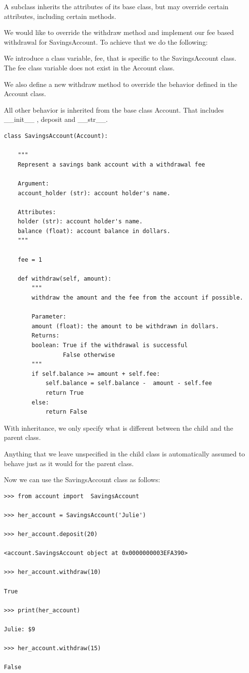 \documentclass{article}
\begin{document}
A subclass inherits the attributes of its base class, but may override certain attributes, including certain methods. 

We would like to override the withdraw method and implement our fee based withdrawal for SavingsAccount.  To achieve that we do the following:

We introduce a class variable, fee, that is specific to the SavingsAccount class.  The fee class variable does not exist in the Account class.  

We also define a new withdraw method to override the behavior defined in the Account class.  

All other behavior is inherited from the base class Account.  That includes {\_}{\_}init{\_}{\_} , deposit and {\_}{\_}str{\_}{\_}.

\begin{lstlisting}
class SavingsAccount(Account):
 
    """
    Represent a savings bank account with a withdrawal fee 
 
    Argument:
    account_holder (str): account holder's name.
 
    Attributes:
    holder (str): account holder's name.
    balance (float): account balance in dollars.
    """
 
    fee = 1
 
    def withdraw(self, amount):
        """
        withdraw the amount and the fee from the account if possible.
 
        Parameter:
        amount (float): the amount to be withdrawn in dollars.
        Returns:
        boolean: True if the withdrawal is successful
                 False otherwise
        """
        if self.balance >= amount + self.fee:
            self.balance = self.balance -  amount - self.fee
            return True
        else:
            return False
\end{lstlisting}
 
With inheritance, we only specify what is different between the child and the parent class. 

Anything that we leave unspecified in the child class is automatically assumed to behave just as it would for the parent class.

Now we can use the SavingsAccount class as follows:

\begin{lstlisting}
>>> from account import  SavingsAccount

>>> her_account = SavingsAccount('Julie')

>>> her_account.deposit(20)

<account.SavingsAccount object at 0x0000000003EFA390>

>>> her_account.withdraw(10)

True

>>> print(her_account)

Julie: $9

>>> her_account.withdraw(15)

False
\end{lstlisting}
\end{document}
